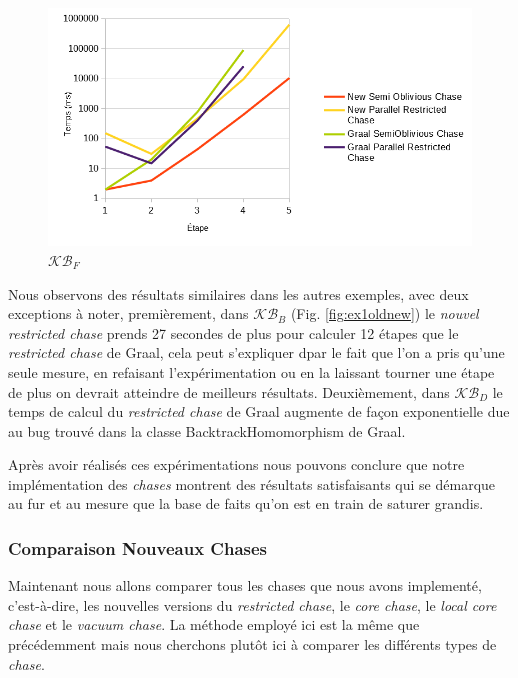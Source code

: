 \begin{figure}
\centering
\includegraphics[width=\textwidth]{pictures/benchmark_old-new/moldnew.png}
\caption{$\mathcal{KB}_F$}
\label{fig:moldnew}
\end{figure}

Nous observons des résultats similaires dans les autres exemples, avec deux exceptions à noter, premièrement, dans $\mathcal{KB}_B$ (Fig. \ref{fig:ex1oldnew}) le \textit{nouvel restricted chase} prends 27 secondes de plus pour calculer 12 étapes que le \textit{restricted chase} de Graal, cela peut s'expliquer dpar le fait que l'on a pris qu'une seule mesure, en refaisant l'expérimentation ou en la laissant tourner une étape de plus on devrait atteindre de meilleurs résultats. Deuxièmement, dans $\mathcal{KB}_D$ le temps de calcul du \textit{restricted chase} de Graal augmente de façon exponentielle due au bug trouvé dans la classe BacktrackHomomorphism de Graal.

Après avoir réalisés ces expérimentations nous pouvons conclure que notre implémentation des \textit{chases} montrent des résultats satisfaisants qui se démarque au fur et au mesure que la base de faits qu'on est en train de saturer grandis. 

\subsubsection{Comparaison Nouveaux Chases}

Maintenant nous allons comparer tous les chases que nous avons implementé, c'est-à-dire, les nouvelles versions du \textit{restricted chase}, le \textit{core chase}, le \textit{local core chase} et le \textit{vacuum chase}. La méthode employé ici est la même que précédemment mais nous cherchons plutôt ici à comparer les différents types de \textit{chase}.


